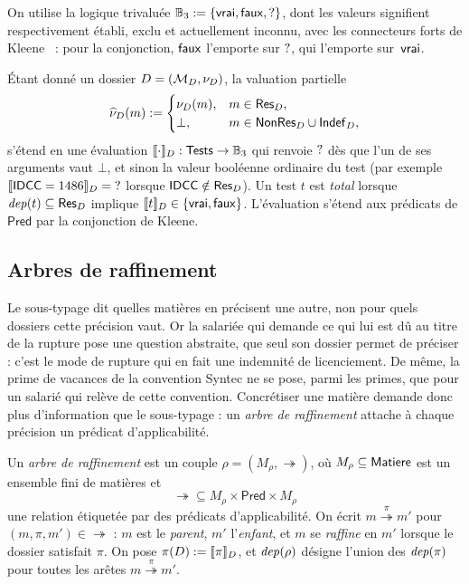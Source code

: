 \documentclass[review]{jflart}
\newcommand{\Pred}{\ensuremath{\mathsf{Pred}}}
\newcommand{\refby}[1]{\mathrel{\overset{#1}{\twoheadrightarrow}}}
\newcommand{\refine}{\mathrel{\twoheadrightarrow}}
\begin{document}
On utilise la logique trivaluée \(\mathbb{B}_3:=\{\mathsf{vrai},\mathsf{faux},\mathord{?}\}\), dont les
valeurs signifient respectivement établi, exclu et actuellement inconnu, avec
les connecteurs forts de Kleene~\cite{kleene1952introduction} : pour la
conjonction, \(\mathsf{faux}\) l'emporte sur \(\mathord{?}\), qui l'emporte
sur~\(\mathsf{vrai}\).

\begin{defi}\label{def:applicability-predicate}
Étant donné un dossier \(D=(\mathcal{M}_D,\nu_D)\), la valuation partielle
\[
 \widehat \nu_D(m):=
 \begin{cases}
  \nu_D(m),&m\in\mathsf{Res}_D,\\
  \bot,&m\in\mathsf{NonRes}_D\cup\mathsf{Indef}_D,
 \end{cases}
\]
s'étend en une évaluation \(\llbracket \cdot\rrbracket_D:\mathsf{Tests}\to\mathbb{B}_3\) qui renvoie
\(\mathord{?}\) dès que l'un de ses arguments vaut \(\bot\), et sinon la valeur
booléenne ordinaire du test (par exemple \(\llbracket \mathsf{IDCC}=1486\rrbracket_D=\mathord{?}\) lorsque
\(\mathsf{IDCC}\notin\mathsf{Res}_D\)). Un test \(t\) est \emph{total} lorsque
\(\mathit{dep}(t)\subseteq\mathsf{Res}_D\) implique \(\llbracket t\rrbracket_D\in\{\mathsf{vrai},\mathsf{faux}\}\).
L'évaluation s'étend aux prédicats de \(\Pred\) par la conjonction de Kleene.
\end{defi}

\subsection{Arbres de raffinement}\label{sec:hierarchie}

Le sous-typage dit quelles matières en précisent une autre, non pour quels
dossiers cette précision vaut. Or la salariée qui demande ce qui lui est dû au titre de la rupture
pose une question abstraite, que seul son dossier permet de préciser : c'est le
mode de rupture qui en fait une indemnité de licenciement. De même, la prime de
vacances de la convention Syntec ne se pose, parmi les primes, que pour un
salarié qui relève de cette convention. Concrétiser une matière demande donc plus
d'information que le sous-typage : un \emph{arbre de raffinement} attache à
chaque précision un prédicat d'applicabilité.

\begin{defi}\label{def:hierarchie}
Un \emph{arbre de raffinement} est un couple \(\rho=(M_\rho,\refine)\), où
\(M_\rho\subseteq\mathsf{Matiere}\) est un ensemble fini de matières et
\[
 {\refine}\subseteq M_\rho\times\Pred\times M_\rho
\]
une relation étiquetée par des prédicats d'applicabilité. On écrit
\(m\refby{\pi}m'\) pour \((m,\pi,m')\in{\refine}\) : \(m\) est le
\emph{parent}, \(m'\) l'\emph{enfant}, et \(m\) se \emph{raffine} en \(m'\)
lorsque le dossier satisfait \(\pi\). On pose \(\pi(D):=\llbracket \pi\rrbracket_D\), et
\(\mathit{dep}(\rho)\) désigne l'union des \(\mathit{dep}(\pi)\) pour toutes les arêtes
\(m\refby{\pi}m'\).
\end{defi}
\end{document}

